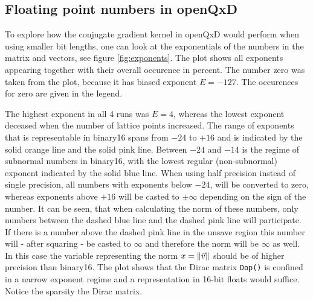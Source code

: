 \documentclass{article}
\theoremstyle{plain} %
\theoremstyle{remark} %
\def\code#1{\texttt{#1}}
\numberwithin{equation}{section}
\begin{document}
\begin{figure}
    \label{fig:number_line}
\end{figure}

\subsection{Floating point numbers in openQxD}

To explore how the conjugate gradient kernel in openQxD would perform when using smaller bit lengths, one can look at the exponentials of the numbers in the matrix and vectors, see figure \ref{fig:exponents}. The plot shows all exponents appearing together with their overall occurence in percent. The number zero was taken from the plot, because it has biased exponent $E=-127$. The occurences for zero are given in the legend.

The highest exponent in all 4 runs was $E=4$, whereas the lowest exponent deceased when the number of lattice points increased. The range of exponents that is representable in \gls{binary16} spans from \textcolor{corange}{$-24$} to \textcolor{cpink}{$+16$} and is indicated by the \textcolor{corange}{solid orange line} and the \textcolor{cpink}{solid pink line}. Between \textcolor{corange}{$-24$} and \textcolor{cblue}{$-14$} is the regime of subnormal numbers in \gls{binary16}, with the lowest regular (non-subnormal) exponent indicated by the \textcolor{cblue}{solid blue line}. When using half precision instead of single precision, all numbers with exponents below \textcolor{corange}{$-24$}, will be converted to zero, whereas exponents above \textcolor{cpink}{$+16$} will be casted to $\pm \infty$ depending on the sign of the number. It can be seen, that when calculating the norm of these numbers, only numbers between the \textcolor{cblue}{dashed blue line} and the \textcolor{cpink}{dashed pink line} will participate. If there is a number above the dashed pink line in the \textcolor{cyellow}{unsave region} this number will - after squaring - be casted to $\infty$ and therefore the norm will be $\infty$ as well\footnotemark. In this case the variable representing the norm $x = \norm{\vec{v}}$ should be of higher precision than \gls{binary16}. The plot shows that the Dirac matrix \code{Dop()} is confined in a narrow exponent regime and a representation in 16-bit floats would suffice. Notice the sparsity the Dirac matrix.

\end{document}
